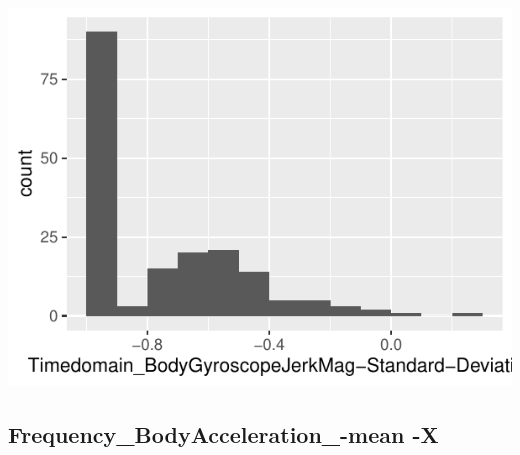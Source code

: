 \documentclass[
]{article}
\begin{document}
\begin{minipage}{0.25 \textwidth}

\includegraphics{codebook_tidydatasub_files/figure-latex/Var-42-Timedomain-BodyGyroscopeJerkMag-Standard-Deviation--1.pdf}

\end{minipage}

\noindent\makebox[\linewidth]{\rule{\textwidth}{0.4pt}}

\hypertarget{frequency_bodyacceleration_-mean--x}{%
\subsection{Frequency\_BodyAcceleration\_-mean
-X}\label{frequency_bodyacceleration_-mean--x}}
\end{document}
